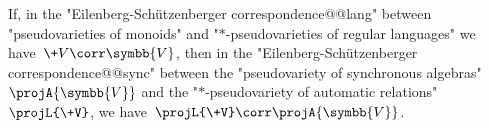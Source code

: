 \begin{theorem}
	\AP\label{thm:lifting-theorem-monoids-pseudovarieties}
	If, in the "Eilenberg-Schützenberger correspondence@@lang"
	between "pseudovarieties of mon\-oids" and "$\ast$-pseudovarieties of regular languages"
	we have~$\+V \corr \symbb{V}$,
	then in the "Eilenberg-Schützenberger correspondence@@sync"
	between the "pseudovariety of synchronous algebras" $\projA{\symbb{V}}$ and
	the "$\ast$-pseudovariety of automatic relations" $\projL{\+V}$,
	we have~$\projL{\+V} \corr \projA{\symbb{V}}$.
\end{theorem}